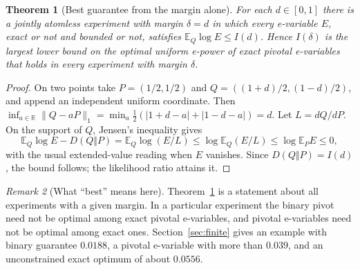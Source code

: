 \documentclass[11pt,a4paper]{article}
\newtheorem{theorem}{Theorem}[section]
\theoremstyle{definition}
\theoremstyle{remark}
\newtheorem{remark}[theorem]{Remark}
\newcommand{\EE}{\mathbb E}
\begin{document}
\begin{theorem}[Best guarantee from the margin alone]\label{thm:sharp}
For each \(d\in[0,1]\) there is a jointly atomless experiment with margin \(\delta=d\) in which every e-variable \(E\), exact or not and bounded or not, satisfies \(\EE_Q\log E\le I(d)\). Hence \(I(\delta)\) is the largest lower bound on the optimal uniform e-power of exact pivotal e-variables that holds in every experiment with margin \(\delta\).
\end{theorem}
\begin{proof}
On two points take \(P=(1/2,1/2)\) and \(Q=((1+d)/2,(1-d)/2)\), and append an independent uniform coordinate. Then
\(\inf_{a\in\mathbb R}\|Q-aP\|_1=\min_a\tfrac12(|1+d-a|+|1-d-a|)=d\). Let \(L=dQ/dP\). On the support of \(Q\), Jensen's inequality gives
\[
 \EE_Q\log E-D(Q\Vert P)=\EE_Q\log(E/L)\le\log\EE_Q(E/L)\le\log\EE_PE\le0,
\]
with the usual extended-value reading when \(E\) vanishes. Since \(D(Q\Vert P)=I(d)\), the bound follows; the likelihood ratio attains it.
\end{proof}

\begin{remark}[What ``best'' means here]\label{rem:sharp}
Theorem~\ref{thm:sharp} is a statement about all experiments with a given margin. In a particular experiment the binary pivot need not be optimal among exact pivotal e-variables, and pivotal e-variables need not be optimal among exact ones. Section~\ref{sec:finite} gives an example with binary guarantee \(0.0188\), a pivotal e-variable with more than \(0.039\), and an unconstrained exact optimum of about \(0.0556\).
\end{remark}
\end{document}

